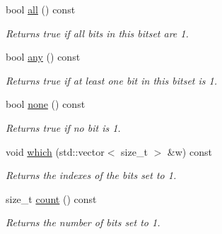 \begin{DoxyCompactItemize}
\mbox{\label{classlgraph_1_1utils_1_1static__bitset_a6092b3d92a70408db6cf67348277eedc}} 
bool \hyperlink{classlgraph_1_1utils_1_1static__bitset_a6092b3d92a70408db6cf67348277eedc}{all} () const
\begin{DoxyCompactList}\small\item\em Returns true if all bits in this bitset are 1. \end{DoxyCompactList}\item 
\mbox{\label{classlgraph_1_1utils_1_1static__bitset_ab0c009df7a6e62809c00f058476f9635}} 
bool \hyperlink{classlgraph_1_1utils_1_1static__bitset_ab0c009df7a6e62809c00f058476f9635}{any} () const
\begin{DoxyCompactList}\small\item\em Returns true if at least one bit in this bitset is 1. \end{DoxyCompactList}\item 
\mbox{\label{classlgraph_1_1utils_1_1static__bitset_ad51513ef0d1d6a97c194e5710f7b3ba5}} 
bool \hyperlink{classlgraph_1_1utils_1_1static__bitset_ad51513ef0d1d6a97c194e5710f7b3ba5}{none} () const
\begin{DoxyCompactList}\small\item\em Returns true if no bit is 1. \end{DoxyCompactList}\item 
void \hyperlink{classlgraph_1_1utils_1_1static__bitset_a05139232b7aabf6b7ca22ecd7f0a4086}{which} (std\+::vector$<$ size\+\_\+t $>$ \&w) const
\begin{DoxyCompactList}\small\item\em Returns the indexes of the bits set to 1. \end{DoxyCompactList}\item 
\mbox{\label{classlgraph_1_1utils_1_1static__bitset_aded63375080e08ae903223b52330bcb5}} 
size\+\_\+t \hyperlink{classlgraph_1_1utils_1_1static__bitset_aded63375080e08ae903223b52330bcb5}{count} () const
\begin{DoxyCompactList}\small\item\em Returns the number of bits set to 1. \end{DoxyCompactList}\item 

\end{DoxyCompactItemize}

